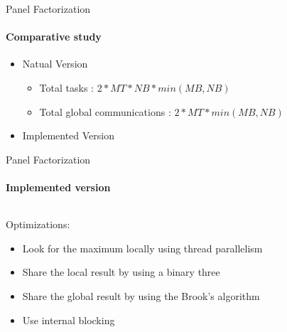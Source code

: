 \documentclass{beamer}
\begin{document}
\begin{frame}{Panel Factorization}
\framesubtitle{Comparative study}
\begin{itemize}
\item Natual Version
\begin{exampleblock}{}
\begin{itemize}
\item Total tasks : $2 * MT * NB * min(MB,NB)$
\item Total global communications : $2 * MT * min(MB,NB)$
\end{itemize}
\end{exampleblock}{}
\item Implemented Version
\end{itemize}
\end{frame}

\begin{frame}{Panel Factorization}
\framesubtitle{Implemented version}
\begin{columns}
\begin{column}{.70\textwidth}
Optimizations:
\begin{itemize}
\item Look for the maximum locally using thread parallelism
\item Share the local result by using a binary three
\item Share the global result by using the Brook's algorithm
\item Use internal blocking
\end{itemize}
\end{column}
\hfill
\begin{column}{.30\textwidth}
\end{column}
\end{columns}
\end{frame}
\end{document}
